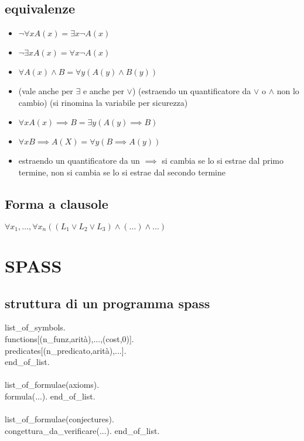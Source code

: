 \documentclass{article}
\newcommand\tab[1][0,5cm]{\hspace*{#1}}
\begin{document}
\begin{multicols*}{3}
 		\subsection{equivalenze}
 		\begin{itemize}
 			\setlength\itemsep{0.1mm}
 			\item \(\neg \forall x A(x) = \exists x\neg A(x)\)
 			\item \(\neg \exists x A(x) = \forall x\neg A(x)\)
 			\item \(\forall A(x) \land B = \forall y (A(y) \land B(y))\) 
 			\item (vale anche per \(\exists\) e anche per \(\lor\)) (estraendo un quantificatore da \(\lor\) o \(\land\) non lo cambio) (si rinomina la variabile per sicurezza)
 			\item \(\forall x A(x) \implies B = \exists y (A(y) \implies B)\)
 			\item \(\forall x B \implies A(X) = \forall y (B \implies A(y))\) 
 			\item estraendo un quantificatore da un \(\implies\) si cambia se lo si estrae dal primo termine, non si cambia se lo si estrae dal secondo termine
 		\end{itemize}
 		\subsection{Forma a clausole}
 		\(\forall x_1,..., \forall x_n ((L_1\lor L_2 \lor L_3)\land (...) \land  ...)\)
 		\section{SPASS}
 		\subsection{struttura di un programma spass}
 		list\_of\_symbols.\\
 		\tab functions[(n\_funz,arità),...,(cost,0)].\\
 		\tab predicates[(n\_predicato,arità),...].\\
 		end\_of\_list.\\\\
 		list\_of\_formulae(axioms).\\
 		\tab formula(...).
 		end\_of\_list.\\\\
 		list\_of\_formulae(conjectures).\\
 		\tab congettura\_da\_verificare(...).
 		end\_of\_list.

\end{multicols*}
\end{document}
